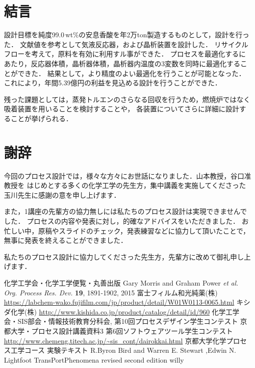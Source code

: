 \documentclass[a4j]{jsreport}
\begin{document}
\clearpage
\chapter{結言}
設計目標を純度99.0\,wt\%の安息香酸を年2万ton製造するものとして，設計を行った．
文献値を参考として気液反応器，および晶析装置を設計した．
リサイクルフローを考えて，原料を有効に利用すル事ができた．
プロセスを最適化するにあたり，反応器体積，晶析器体積，晶析器内温度の3変数を同時に最適化することができた．
結果として，より精度のよい最適化を行うことが可能となった．
これにより，年間5.39億円の利益を見込める設計を行うことができた．

残った課題としては，蒸発トルエンのさらなる回収を行うため，燃焼炉ではなく吸着装置を用いることを検討することや，
各装置についてさらに詳細に設計することが挙げられる．


\clearpage
\chapter*{謝辞}
今回のプロセス設計では，様々な方々にお世話になりました．山本教授，谷口准教授を
はじめとする多くの化学工学の先生方，集中講義を実施してくださった玉川先生に感謝の意を申し上げます．

また，1講座の先輩方の協力無しには私たちのプロセス設計は実現できませんでした．
プロセスの内容や発表に対し，的確なアドバイスをいただきました．
お忙しい中，原稿やスライドのチェック，発表練習などに協力して頂いたことで，無事に発表を終えることができました．

私たちのプロセス設計に協力してくださった先生方，先輩方に改めて御礼申し上げます．


\clearpage

\begin{thebibliography}{10}
     化学工学会・化学工学便覧・丸善出版
     Gary Morris and  Graham Power \textit{et al.  Org. Process Res. Dev.} \textbf{19}, 1891-1902, 2015
     富士フィルム和光純薬(株) \url{https://labchem-wako.fujifilm.com/jp/product/detail/W01W0113-0065.html}
     キシダ化学(株) \url{http://www.kishida.co.jp/product/catalog/detail/id/960}
     化学工学会・SIS部会・情報技術教育分科会, 第10回プロセスデザイン学生コンテスト
     京都大学・プロセス設計講義資料3
     第6回ソフトウェアツール学生コンテスト \url{http://www.chemeng.titech.ac.jp/~sis_cont/dairokkai.html}
     京都大学化学プロセス工学コース 実験テキスト
     R.Byron Bird and Warren E. Stewart ,Edwin N. Lightfoot   TransPortPhenomena revised second edition   willy
\end{thebibliography}
\end{document}

